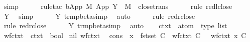 \begin{isabellebody}
\ simp\isanewline
\ \ \ \ \isamarkupfalse%
\ {\isacharparenleft}rule{\isacharunderscore}tac\ b{\isacharequal}{\isachardoublequoteopen}App\ M{\isacharprime}\ {\isacharparenleft}App\ {\isacharparenleft}Y\ {\isasymsigma}{\isacharparenright}\ M{\isacharparenright}{\isachardoublequoteclose}\ \ close{\isachardot}trans{\isacharparenright}\isanewline
\ \ \ \ \isamarkupfalse%
\ {\isacharparenleft}rule\ red{\isacharunderscore}l{\isacharunderscore}close{\isacharparenright}\isanewline
\ \ \ \ \isamarkupfalse%
\ Y\ \isamarkupfalse%
\ simp\isanewline
\ \ \ \ \isamarkupfalse%
\ Y\ trm{\isacharunderscore}pbeta{\isacharunderscore}simp{}\ \isamarkupfalse%
\ auto{\isacharbrackleft}{}{\isacharbrackright}\isanewline
\ \ \ \ \isamarkupfalse%
\ {\isacharparenleft}rule\ red{\isacharunderscore}r{\isacharunderscore}close{\isacharparenright}\isanewline
\ \ \ \ \isamarkupfalse%
\ {\isacharparenleft}rule\ red{\isacharunderscore}r{\isacharunderscore}close{\isacharparenright}\isanewline
\ \ \ \ \isamarkupfalse%
\ Y\ trm{\isacharunderscore}pbeta{\isacharunderscore}simp{}\ \isamarkupfalse%
\ auto\isanewline
\ \ \isamarkupfalse%
\isanewline
{}\isamarkupfalse%
%
\endisatagproof
{\isafoldproof}%
%
\isadelimproof
%
\endisadelimproof
%
\isamarkuptrue%
\isamarkupfalse%
\ ctxt\ {\isacharequal}\ {\isachardoublequoteopen}{\isacharparenleft}atom\ {\isasymtimes}\ type{\isacharparenright}\ list{\isachardoublequoteclose}\isanewline
\isanewline
{}\isamarkupfalse%
\ wf{\isacharunderscore}ctxt\ {\isacharcolon}{\isacharcolon}\ {\isachardoublequoteopen}ctxt\ {\isasymRightarrow}\ bool{\isachardoublequoteclose}\ \isanewline
nil{\isacharcolon}\ {\isachardoublequoteopen}wf{\isacharunderscore}ctxt\ {\isacharbrackleft}{\isacharbrackright}{\isachardoublequoteclose}\ {\isacharbar}\isanewline
cons{\isacharcolon}\ {\isachardoublequoteopen}{\isasymlbrakk}\ x\ {\isasymnotin}\ fst{\isacharbackquote}set\ C\ {\isacharsemicolon}\ wf{\isacharunderscore}ctxt\ C\ {\isasymrbrakk}\ {\isasymLongrightarrow}\ wf{\isacharunderscore}ctxt\ {\isacharparenleft}{\isacharparenleft}x{\isacharcomma}\ {\isasymsigma}{\isacharparenright}{\isacharhash}C{\isacharparenright}{\isachardoublequoteclose}\isanewline
\isanewline
{}\isamarkupfalse%

\end{isabellebody}
